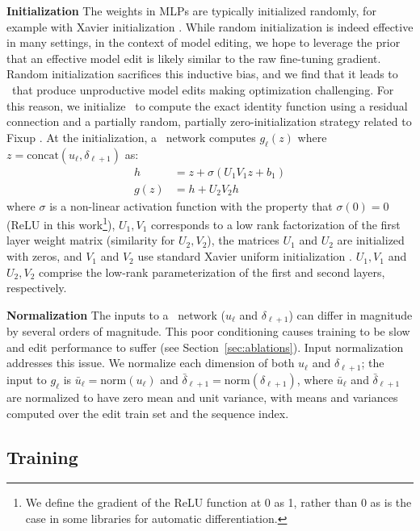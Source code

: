 \documentclass{article}
\begin{document}
\textbf{Initialization} The weights in MLPs are typically initialized randomly, for example with Xavier initialization \citep{pmlr-v9-glorot10a}. While random initialization is indeed effective in many settings, in the context of model editing, we hope to leverage the prior that an effective model edit is likely similar to the raw fine-tuning gradient. Random initialization sacrifices this inductive bias, and we find that it leads to \name~that produce unproductive model edits making optimization challenging. For this reason, we initialize \name~to compute the exact identity function using a residual connection \citep{he2016deep} and a partially random, partially zero-initialization strategy related to Fixup \citep{zhang2018residual}. At the initialization, a \name~network computes $g_\ell(z)$ where $z=\text{concat}(u_\ell, \delta_{\ell+1})$ as:
\begin{align}
    h &= z + \sigma(U_1V_1 z + b_1) \\
    g(z) &= h + U_2V_2 h
\end{align}
where $\sigma$ is a non-linear activation function with the property that $\sigma(0) = 0$ (ReLU in this work\footnote{We define the gradient of the ReLU function at 0 as 1, rather than 0 as is the case in some libraries for automatic differentiation.}), $U_1,V_1$ corresponds to a low rank factorization of the first layer weight matrix (similarity for $U_2,V_2$), the matrices $U_1$ and $U_2$ are initialized with zeros, and $V_1$ and $V_2$ use standard Xavier uniform initialization \citep{pmlr-v9-glorot10a}. $U_1,V_1$ and $U_2,V_2$ comprise the low-rank parameterization of the first and second layers, respectively.

\textbf{Normalization} The inputs to a \name~network ($u_\ell$ and $\delta_{\ell+1}$) can differ in magnitude by several orders of magnitude. This poor conditioning causes training to be slow and edit performance to suffer (see Section~\ref{sec:ablations}). Input normalization addresses this issue. We normalize each dimension of both $u_\ell$ and $\delta_{\ell+1}$; the input to $g_\ell$ is $\bar{u}_\ell=\text{norm}(u_\ell)$ and $\bar{\delta}_{\ell+1} = \text{norm}(\delta_{\ell+1})$, where $\bar{u}_\ell$ and $\bar{\delta}_{\ell+1}$ are normalized to have zero mean and unit variance, with means and variances computed over the edit train set and the sequence index.

\subsection{Training \name}
\end{document}

